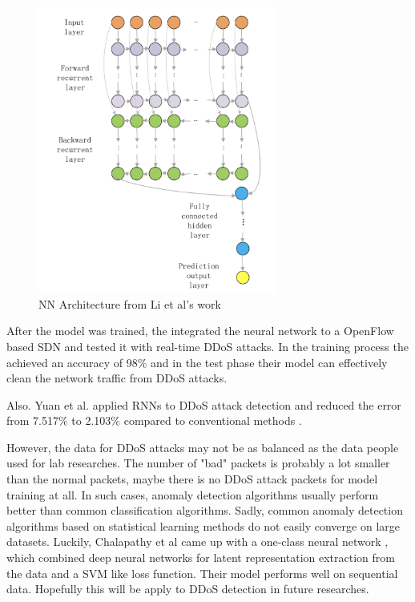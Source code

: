 \documentclass[paper=a4, fontsize=12pt]{scrartcl} %
\numberwithin{equation}{section} %
\numberwithin{figure}{section} %
\numberwithin{table}{section} %
\begin{document}
\begin{figure}[htbp!]
		\centering
		\includegraphics[width=0.7\textwidth]{fig3.png}
		\caption{NN Architecture from Li et al's work}%
		\vspace{-1em}
\end{figure}

After the model was trained, the integrated the neural network to a OpenFlow based SDN and tested it with real-time DDoS attacks. In the training process the achieved an accuracy of 98$\%$ and in the test phase their model can effectively clean the network traffic from DDoS attacks.

Also. Yuan et al. applied RNNs to DDoS attack detection and reduced the error from 7.517$\%$ to 2.103$\%$ compared to conventional methods \cite{yuan_deepdefense:_2017}.

However, the data for DDoS attacks may not be as balanced as the data people used for lab researches. The number of "bad" packets is probably a lot smaller than the normal packets, maybe there is no DDoS attack packets for model training at all. In such cases, anomaly detection algorithms usually perform better than common classification algorithms. Sadly, common anomaly detection algorithms based on statistical learning methods do not easily converge on large datasets. Luckily, Chalapathy et al came up with a one-class neural network \cite{chalapathy_anomaly_2018}, which combined deep neural networks for latent representation extraction from the data and a SVM like loss function. Their model performs well on sequential data. Hopefully this will be apply to DDoS detection in future researches.
\end{document}
